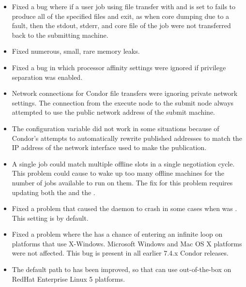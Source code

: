 \begin{itemize}

\item
  Fixed a bug where if a user job using file transfer with
   and 
  is set to  fails
  to produce all of the specified files and exit, as when core
  dumping due to a fault, then the stdout, stderr, and core file of the
  job were not transferred back to the submitting machine.

\item
  Fixed numerous, small, rare memory leaks.

\item 
  Fixed a bug in which processor affinity settings were ignored if
  privilege separation was enabled.

\item Network connections for Condor file transfers were ignoring
  private network settings.  The connection from the execute node to
  the submit node always attempted to use the public network address
  of the submit machine.

\item The configuration variable  did not work
in some situations
because of Condor's attempts to automatically rewrite published addresses to
match the IP address of the network interface used to make the publication.

\item A single job could match multiple offline slots in a single
negotiation cycle.  This problem could cause  to
wake up too many offline machines for the number of jobs available
to run on them.  The fix for this problem requires updating both
the  and the .

\item Fixed a problem that caused the  daemon to
crash in some cases when  was .
This setting is  by default.

\item Fixed a problem where the  has a chance of
entering an infinite loop on platforms that use X-Windows.
Microsoft Windows and Mac OS X platforms were not affected.  This bug is
present in all earlier 7.4.x Condor releases.

\item The default path to  has been improved,
 so that  can use  out-of-the-box on 
RedHat Enterprise Linux 5 platforms.


\end{itemize}
